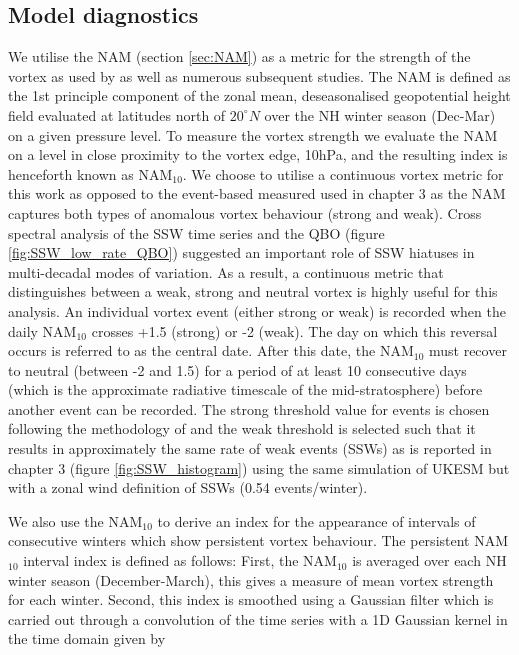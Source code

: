 \subsection{Model diagnostics}
\label{sec:model_diagnostics_surface}
We utilise the NAM (section \ref{sec:NAM}) as a metric for the strength of the vortex as used by \cite{baldwinStratospheric2001a} as well as numerous subsequent studies. The NAM is defined as the 1st principle component of the zonal mean, deseasonalised geopotential height field evaluated at latitudes north of $20^{\circ}N$ over the NH winter season (Dec-Mar) on a given pressure level. To measure the vortex strength we evaluate the NAM on a level in close proximity to the vortex edge, 10hPa, and the resulting index is henceforth known as NAM$_{10}$. We choose to utilise a continuous vortex metric for this work as opposed to the event-based measured used in chapter 3 as the NAM captures both types of anomalous vortex behaviour (strong and weak). Cross spectral analysis of the SSW time series and the QBO (figure \ref{fig:SSW_low_rate_QBO}) suggested an important role of SSW hiatuses in multi-decadal modes of variation. As a result, a continuous metric that distinguishes between a weak, strong and neutral vortex is highly useful for this analysis. An individual vortex event (either strong or weak) is recorded when the daily NAM$_{10}$ crosses +1.5 (strong) or -2 (weak). The day on which this reversal occurs is referred to as the central date. After this date, the NAM$_10$ must recover to neutral (between -2 and 1.5) for a period of at least 10 consecutive days (which is the approximate radiative timescale of the mid-stratosphere) before another event can be recorded. The strong threshold value for events is chosen following the methodology of \cite{baldwinStratospheric2001a} and the weak threshold is selected such that it results in approximately the same rate of weak events (SSWs) as is reported in chapter 3 (figure \ref{fig:SSW_histogram}) using the same simulation of UKESM but with a zonal wind definition of SSWs (0.54 events/winter).

We also use the NAM$_{10}$ to derive an index for the appearance of intervals of consecutive winters which show persistent vortex behaviour. The persistent NAM$_{10}$ interval index is defined as follows: First, the NAM$_{10}$ is averaged over each NH winter season (December-March), this gives a measure of mean vortex strength for each winter. Second, this index is smoothed using a Gaussian filter which is carried out through a convolution of the time series with a 1D Gaussian kernel in the time domain given by

